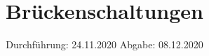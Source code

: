 

\subject{V302}
\title{Brückenschaltungen}
\date{%
  Durchführung: 24.11.2020
  \hspace{3em}
  Abgabe: 08.12.2020
}



\maketitle
\thispagestyle{empty}
\tableofcontents
\newpage





\nocite{*}
\printbibliography{}


